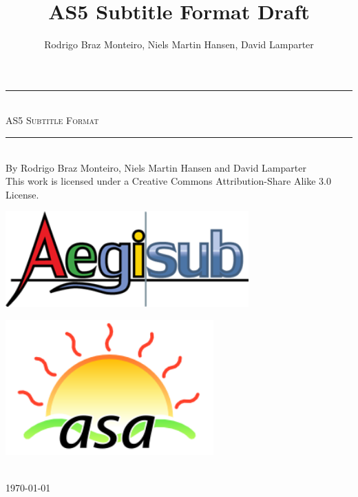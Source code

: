 \documentclass{spec}
\newcommand{\HRule}{\rule{\linewidth}{0.5mm}}
\begin{document}
\title{AS5 Subtitle Format Draft}
\author{Rodrigo Braz Monteiro, Niels Martin Hansen, David Lamparter}

\begin{titlepage}
\begin{center}

\vspace*{3cm}

\HRule \\[0.5cm]
\textsc{\huge AS5 Subtitle Format}\\
\HRule \\[1.1cm]
{\large By Rodrigo Braz Monteiro, Niels Martin Hansen and David Lamparter}\\[0.3cm]
This work is licensed under a Creative Commons Attribution-Share Alike 3.0 License.\\
\vfill

\begin{minipage}{0.4\textwidth}
\begin{flushleft} \large
\includegraphics[width=0.7\textwidth]{./aegisub}
\end{flushleft}
\end{minipage}
\begin{minipage}{0.4\textwidth}
\begin{flushright} \large
\includegraphics[width=0.6\textwidth]{./asa}
\end{flushright}
\end{minipage}\\[1.5cm]

{\large \today}

\end{center}
\end{titlepage}
\end{document}
